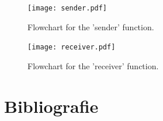 \documentclass[10pt,a4paper]{article}
\begin{document}
\begin{figure}[H]
   \centering
   \texttt{[image: sender.pdf]}
   \caption{Flowchart for the 'sender' function.}
   \label{fig:sender}
\end{figure}

\begin{figure}[H]
   \centering
   \texttt{[image: receiver.pdf]}
   \caption{Flowchart for the 'receiver' function.}
   \label{fig:receiver}
\end{figure}

\section{Bibliografie}


\end{document}
